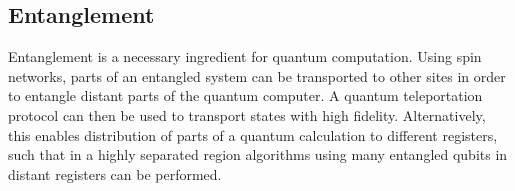 \subsection{Entanglement}

\begin{center}
\end{center}

\noindent Entanglement is a necessary ingredient for quantum computation. Using spin networks, parts of an entangled system can be transported to other sites in order to entangle distant parts of the quantum computer. A quantum teleportation protocol can then be used to transport states with high fidelity. Alternatively, this enables distribution of parts of a quantum calculation to different registers, such that in a highly separated region algorithms using many entangled qubits in distant registers can be performed.

